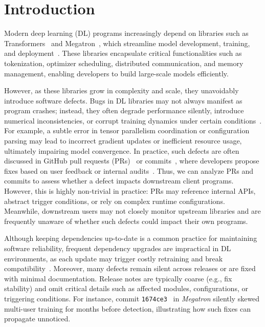 \section{Introduction}
\label{introduction}

Modern deep learning (DL) programs increasingly depend on libraries such as Transformers~\cite{transformers} and Megatron~\cite{megatron}, which streamline model development, training, and deployment~\cite{zeng2024survey,alfadel2023empirical,wu2023understanding,lyu2023chronos,kula2018developers,samarinunderstanding,chen2023toward,pepe2024taxonomy,li2024knowbug,jia2021symptoms,otoom2019automated}. 
These libraries encapsulate critical functionalities such as tokenization, optimizer scheduling, distributed communication, and memory management, enabling developers to build large-scale models efficiently.

However, as these libraries grow in complexity and scale, they unavoidably introduce software defects. 
Bugs in DL libraries may not always manifest as program crashes; instead, they often degrade performance silently, introduce numerical inconsistencies, or corrupt training dynamics under certain conditions~\cite{chen2023toward,yu2025towards}. 
For example, a subtle error in tensor parallelism coordination or configuration parsing may lead to incorrect gradient updates or inefficient resource usage, ultimately impairing model convergence.
In practice, such defects are often discussed in GitHub pull requests (PRs)~\cite{pr} or commits~\cite{commit}, where developers propose fixes based on user feedback or internal audits~\cite{xiao2024generative,herbold2022fine}.
Thus, we can analyze PRs and commits to assess whether a defect impacts downstream client programs.
However, this is highly non-trivial in practice: PRs may reference internal APIs, abstract trigger conditions, or rely on complex runtime configurations. 
Meanwhile, downstream users may not closely monitor upstream libraries and are frequently unaware of whether such defects could impact their own programs.

Although keeping dependencies up-to-date is a common practice for maintaining software reliability, frequent dependency upgrades are impractical in DL environments, as each update may trigger costly retraining and break compatibility~\cite{2024Understanding,2023Toward,2024Bug,10.5555/3767901.3767919}.
Moreover, many defects remain silent across releases or are fixed with minimal documentation.
Release notes are typically coarse (e.g., fix stability) and omit critical details such as affected modules, configurations, or triggering conditions.
For instance, commit \texttt{1674ce3}~\cite{1674ce3} in \textit{Megatron} silently skewed multi-user training for months before detection, illustrating how such fixes can propagate unnoticed.

